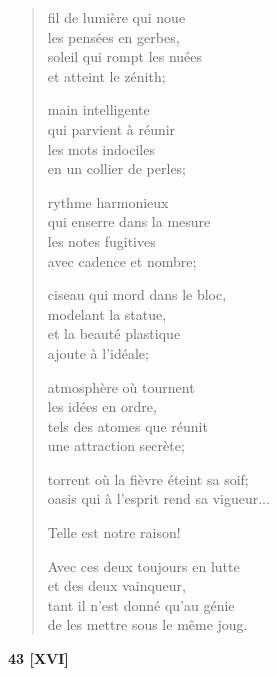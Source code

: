 \begin{verse}
  fil de lumière qui noue \\
  les pensées en gerbes, \\
  soleil qui rompt les nuées \\
  et atteint le zénith;

  main intelligente \\
  qui parvient à réunir \\
  les mots indociles \\
  en un collier de perles;

  rythme harmonieux \\
  qui enserre dans la mesure \\
  les notes fugitives \\
  avec cadence et nombre;

  ciseau qui mord dans le bloc, \\
  modelant la statue, \\
  et la beauté plastique \\
  ajoute à l'idéale;

  atmosphère où tournent \\
  les idées en ordre, \\
  tels des atomes que réunit \\
  une attraction secrète;

  torrent où la fièvre
  éteint sa soif; \\
  oasis qui à l'esprit
  rend sa vigueur...

  Telle est notre raison!

  Avec ces deux toujours en lutte \\
  et des deux vainqueur, \\
  tant il n'est donné qu'au génie \\
  de les mettre sous le même joug.
\end{verse}

\pagebreak

\begin{center}
  \textbf{43 [XVI]}
\end{center}

